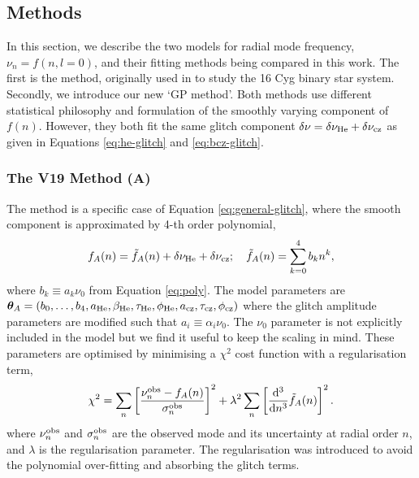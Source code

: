 \subsection{Methods}\label{sec:glitch-methods}

In this section, we describe the two models for radial mode frequency, \(\nu_n = f(n, l=0)\), and their fitting methods being compared in this work. The first is the  method, originally used in \citet{Verma.Faria.ea2014} to study the 16 Cyg binary star system. Secondly, we introduce our new `GP method'. Both methods use different statistical philosophy and formulation of the smoothly varying component of \(f(n)\). However, they both fit the same glitch component \(\delta\nu = \delta\nu_{{\mathrm{He}}} + \delta\nu_{{\mathrm{cz}}}\) as given in Equations \ref{eq:he-glitch} and \ref{eq:bcz-glitch}.

\subsubsection{The V19 Method (A)}

The  method is a specific case of Equation \ref{eq:general-glitch}, where the smooth component is approximated by 4-th order polynomial,
%
\begin{equation}
    f_A(n) = \tilde{f}_A(n) + \delta\nu_{{\mathrm{He}}} + \delta\nu_{{\mathrm{cz}}}; \quad \tilde{f}_A(n) = \sum_{k=0}^{4} b_k n^k,
\end{equation}
%
\sloppy where \(b_k \equiv a_k \nu_0\) from Equation \ref{eq:poly}. The model parameters are \(\bm{\theta}_A = (b_0, \dots, b_4, a_{{\mathrm{He}}}, \beta_{{\mathrm{He}}}, \tau_{{\mathrm{He}}}, \phi_{{\mathrm{He}}}, a_{{\mathrm{cz}}}, \tau_{{\mathrm{cz}}}, \phi_{{\mathrm{cz}}})\) where the glitch amplitude parameters are modified such that \(a_i \equiv \alpha_i\nu_0\). The \(\nu_0\) parameter is not explicitly included in the  model but we find it useful to keep the scaling in mind. These parameters are optimised by minimising a \(\chi^2\) cost function with a regularisation term,
%
\begin{equation}
    \chi^2 = \sum_n \left[ \frac{\nu_n^{{\mathrm{obs}}} - f_{A}(n)}{\sigma_n^{{\mathrm{obs}}}} \right]^2 + \lambda^2 \sum_n \left[ \frac{\mathrm{d}^3}{\mathrm{d} n^3} \tilde{f}_A(n)\right]^2.
\end{equation}
%
where \(\nu_n^{{\mathrm{obs}}}\) and \(\sigma_n^{{\mathrm{obs}}}\) are the observed mode and its uncertainty at radial order \(n\), and \(\lambda\) is the regularisation parameter. The regularisation was introduced to avoid the polynomial over-fitting and absorbing the glitch terms.

